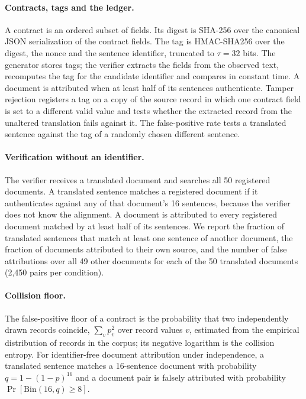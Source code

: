 \documentclass[12pt]{article}
\begin{document}
\paragraph{Contracts, tags and the ledger.} A contract is an ordered subset of fields. Its digest is SHA-256 over the canonical JSON serialization of the contract fields. The tag is HMAC-SHA256\cite{krawczyk1997hmac} over the digest, the nonce and the sentence identifier, truncated to $\tau=32$ bits. The generator stores tags; the verifier extracts the fields from the observed text, recomputes the tag for the candidate identifier and compares in constant time. A document is attributed when at least half of its sentences authenticate. Tamper rejection registers a tag on a copy of the source record in which one contract field is set to a different valid value and tests whether the extracted record from the unaltered translation fails against it. The false-positive rate tests a translated sentence against the tag of a randomly chosen different sentence.

\paragraph{Verification without an identifier.} The verifier receives a translated document and searches all 50 registered documents. A translated sentence matches a registered document if it authenticates against any of that document's 16 sentences, because the verifier does not know the alignment. A document is attributed to every registered document matched by at least half of its sentences. We report the fraction of translated sentences that match at least one sentence of another document, the fraction of documents attributed to their own source, and the number of false attributions over all 49 other documents for each of the 50 translated documents (2,450 pairs per condition).

\paragraph{Collision floor.} The false-positive floor of a contract is the probability that two independently drawn records coincide, $\sum_v p_v^2$ over record values $v$, estimated from the empirical distribution of records in the corpus; its negative logarithm is the collision entropy. For identifier-free document attribution under independence, a translated sentence matches a 16-sentence document with probability $q=1-(1-p)^{16}$ and a document pair is falsely attributed with probability $\Pr[\mathrm{Bin}(16,q)\ge 8]$.
\end{document}
